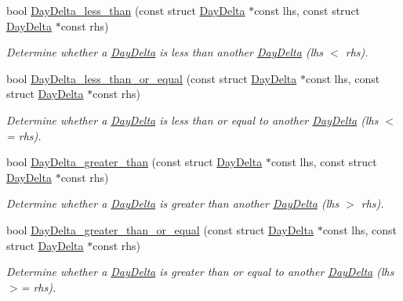 \begin{DoxyCompactItemize}
bool \hyperlink{day-delta_8h_a6f5d869af818b98f4de7d906dab71b0a}{\-Day\-Delta\-\_\-less\-\_\-than} (const struct \hyperlink{structDayDelta}{\-Day\-Delta} $\ast$const lhs, const struct \hyperlink{structDayDelta}{\-Day\-Delta} $\ast$const rhs)
\begin{DoxyCompactList}\small\item\em \-Determine whether a \hyperlink{structDayDelta}{\-Day\-Delta} is less than another \hyperlink{structDayDelta}{\-Day\-Delta} (lhs $<$ rhs). \end{DoxyCompactList}\item 
bool \hyperlink{day-delta_8h_a7a5580c989e8ed73711ddd58774921b1}{\-Day\-Delta\-\_\-less\-\_\-than\-\_\-or\-\_\-equal} (const struct \hyperlink{structDayDelta}{\-Day\-Delta} $\ast$const lhs, const struct \hyperlink{structDayDelta}{\-Day\-Delta} $\ast$const rhs)
\begin{DoxyCompactList}\small\item\em \-Determine whether a \hyperlink{structDayDelta}{\-Day\-Delta} is less than or equal to another \hyperlink{structDayDelta}{\-Day\-Delta} (lhs $<$= rhs). \end{DoxyCompactList}\item 
bool \hyperlink{day-delta_8h_af08c53aa4d2a12d1ecd7aec10e0d938b}{\-Day\-Delta\-\_\-greater\-\_\-than} (const struct \hyperlink{structDayDelta}{\-Day\-Delta} $\ast$const lhs, const struct \hyperlink{structDayDelta}{\-Day\-Delta} $\ast$const rhs)
\begin{DoxyCompactList}\small\item\em \-Determine whether a \hyperlink{structDayDelta}{\-Day\-Delta} is greater than another \hyperlink{structDayDelta}{\-Day\-Delta} (lhs $>$ rhs). \end{DoxyCompactList}\item 
bool \hyperlink{day-delta_8h_a19ecc3edc24e80fdfeec033af8085d15}{\-Day\-Delta\-\_\-greater\-\_\-than\-\_\-or\-\_\-equal} (const struct \hyperlink{structDayDelta}{\-Day\-Delta} $\ast$const lhs, const struct \hyperlink{structDayDelta}{\-Day\-Delta} $\ast$const rhs)
\begin{DoxyCompactList}\small\item\em \-Determine whether a \hyperlink{structDayDelta}{\-Day\-Delta} is greater than or equal to another \hyperlink{structDayDelta}{\-Day\-Delta} (lhs $>$= rhs). \end{DoxyCompactList}\end{DoxyCompactItemize}


